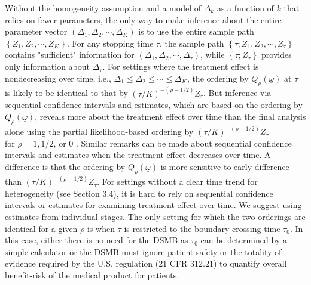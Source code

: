 \documentclass[10pt]{article}
\begin{document}
Without the homogeneity assumption and a model of $\Delta_{k}$ as a function of $k$ that relies on fewer parameters, the only way to make inference about the entire parameter vector $\left(\Delta_{1}, \Delta_{2}, \cdots, \Delta_{K}\right)$ is to use the entire sample path $\left\{Z_{1}, Z_{2}, \cdots, Z_{K}\right\}$. For any stopping time $\tau$, the sample path $\left\{\tau ; Z_{1}, Z_{2}, \cdots, Z_{\tau}\right\}$ contains "sufficient" information for $\left(\Delta_{1}, \Delta_{2}, \cdots, \Delta_{\tau}\right)$, while $\left\{\tau ; Z_{\tau}\right\}$ provides only information about $\Delta_{\tau}$. For settings where the treatment effect is nondecreasing over time, i.e., $\Delta_{1} \leq \Delta_{2} \leq \cdots \leq \Delta_{K}$, the ordering by $Q_{\rho}(\underline{\omega})$ at $\tau$ is likely to be identical to that by $(\tau / K)^{-(\rho-1 / 2)} Z_{\tau}$. But inference via sequential confidence intervals and estimates, which are based on the ordering by $Q_{\rho}(\underline{\omega})$, reveals more about the treatment effect over time than the final analysis alone using the partial likelihood-based ordering by $(\tau / K)^{-(\rho-1 / 2)} Z_{\tau}$\\
for $\rho=1,1 / 2$, or 0 . Similar remarks can be made about sequential confidence intervals and estimates when the treatment effect decreases over time. A difference is that the ordering by $Q_{\rho}(\underline{\omega})$ is more sensitive to early difference than $(\tau / K)^{-(\rho-1 / 2)} Z_{\tau}$. For settings without a clear time trend for heterogeneity (see Section 3.4), it is hard to rely on sequential confidence intervals or estimates for examining treatment effect over time. We suggest using estimates from individual stages. The only setting for which the two orderings are identical for a given $\rho$ is when $\tau$ is restricted to the boundary crossing time $\tau_{0}$. In this case, either there is no need for the DSMB as $\tau_{0}$ can be determined by a simple calculator or the DSMB must ignore patient safety or the totality of evidence required by the U.S. regulation (21 CFR 312.21) to quantify overall benefit-risk of the medical product for patients.
\end{document}
